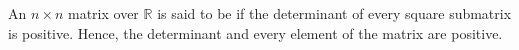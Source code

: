 \documentclass[12pt]{article}
\begin{document}
An $n \times n$ matrix over $\mathbb{R}$ is said to be  
if the determinant of every square submatrix is positive. Hence, the determinant 
and every element of the matrix are positive.
\end{document}
